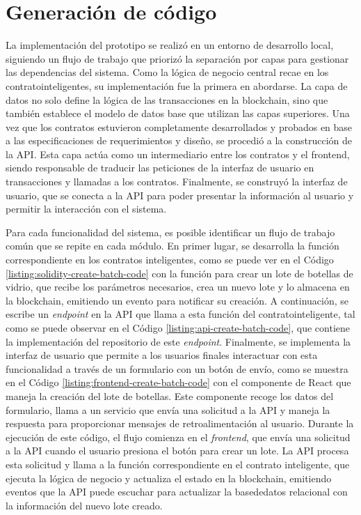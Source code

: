 \section{Generación de código}
\label{sec:code-generation}

La implementación del prototipo se realizó en un entorno de desarrollo local, siguiendo un flujo de trabajo que priorizó la separación por capas para gestionar las dependencias del sistema. Como la lógica de negocio central recae en los \glspl{contratointeligente}, su implementación fue la primera en abordarse. La capa de datos no solo define la lógica de las transacciones en la blockchain, sino que también establece el modelo de datos base que utilizan las capas superiores. Una vez que los contratos estuvieron completamente desarrollados y probados en base a las especificaciones de requerimientos y diseño, se procedió a la construcción de la API. Esta capa actúa como un intermediario entre los contratos y el \gls{frontend}, siendo responsable de traducir las peticiones de la interfaz de usuario en transacciones y llamadas a los contratos. Finalmente, se construyó la interfaz de usuario, que se conecta a la API para poder presentar la información al usuario y permitir la interacción con el sistema.

Para cada funcionalidad del sistema, es posible identificar un flujo de trabajo común que se repite en cada módulo. En primer lugar, se desarrolla la función correspondiente en los contratos inteligentes, como se puede ver en el Código \ref{listing:solidity-create-batch-code} con la función para crear un lote de botellas de vidrio, que recibe los parámetros necesarios, crea un nuevo lote y lo almacena en la blockchain, emitiendo un evento para notificar su creación. A continuación, se escribe un \textit{\gls{endpoint}} en la API que llama a esta función del \gls{contratointeligente}, tal como se puede observar en el Código \ref{listing:api-create-batch-code}, que contiene la implementación del repositorio de este \textit{endpoint}. Finalmente, se implementa la interfaz de usuario que permite a los usuarios finales interactuar con esta funcionalidad a través de un formulario con un botón de envío, como se muestra en el Código \ref{listing:frontend-create-batch-code} con el componente de React que maneja la creación del lote de botellas. Este componente recoge los datos del formulario, llama a un servicio que envía una solicitud a la API y maneja la respuesta para proporcionar mensajes de retroalimentación al usuario. Durante la ejecución de este código, el flujo comienza en el \textit{frontend}, que envía una solicitud a la API cuando el usuario presiona el botón para crear un lote. La API procesa esta solicitud y llama a la función correspondiente en el contrato inteligente, que ejecuta la lógica de negocio y actualiza el estado en la blockchain, emitiendo eventos que la API puede escuchar para actualizar la \gls{basededatos} relacional con la información del nuevo lote creado. 

